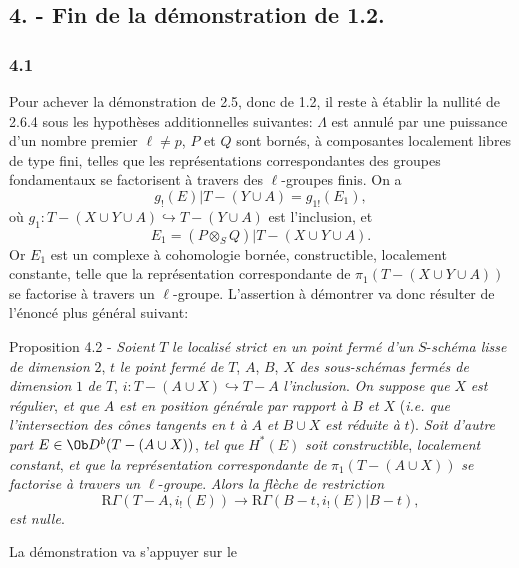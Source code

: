 \subsection*{4. - Fin de la démonstration de 1.2.}

\subsubsection*{4.1}
Pour achever la démonstration de 2.5, donc de 1.2, il reste à établir la nullité de 2.6.4 sous les hypothèses additionnelles suivantes: $\Lambda$ est annulé par une puissance d'un nombre premier $\ell\ne p$, $P$ et $Q$ sont bornés, à composantes localement libres de type fini, telles que les représentations correspondantes des groupes fondamentaux se factorisent à travers des $\ell$-groupes finis. On a
\[
g_!(E)|T-(Y\cup A)=g_{1!}(E_1),
\]
où $g_1:T-(X\cup Y\cup A)\hookrightarrow T-(Y\cup A)$ est l'inclusion, et
\[
E_1=(P\otimes_S Q)|T-(X\cup Y\cup A).
\]
Or $E_1$ est un complexe à cohomologie bornée, constructible, localement constante, telle que la représentation correspondante de $\pi_1(T-(X\cup Y\cup A))$ se factorise à travers un $\ell$-groupe. L'assertion à démontrer va donc résulter de l'énoncé plus général suivant:

\begin{statement}{Proposition 4.2 -}
\emph{Soient} $T$ \emph{le localisé strict en un point fermé d'un} $S$-\emph{schéma lisse de dimension} $2$, $t$ \emph{le point fermé de} $T$, $A$, $B$, $X$ \emph{des sous-schémas fermés de dimension} $1$ \emph{de} $T$, $i:T-(A\cup X)\hookrightarrow T-A$ \emph{l'inclusion}. \emph{On suppose que} $X$ \emph{est régulier}, \emph{et que} $A$ \emph{est en position générale par rapport à} $B$ \emph{et} $X$ (\emph{i.e. que l'intersection des cônes tangents en} $t$ \emph{à} $A$ \emph{et} $B\cup X$ \emph{est réduite à} $t$). \emph{Soit d'autre part} $E\in\Ob D^b(T-(A\cup X))$, \emph{tel que} $H^*(E)$ \emph{soit constructible}, \emph{localement constant}, \emph{et que la représentation correspondante de} $\pi_1(T-(A\cup X))$ \emph{se factorise à travers un} $\ell$-\emph{groupe}. \emph{Alors la flèche de restriction}
\[
\mathrm{R}\Gamma(T-A,i_!(E))
\longrightarrow
\mathrm{R}\Gamma(B-t,i_!(E)|B-t),
\]
\emph{est nulle}.
\end{statement}

La démonstration va s'appuyer sur le

